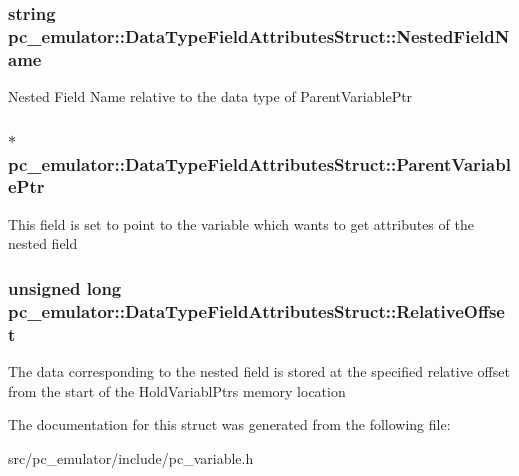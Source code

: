 \subsubsection[{\texorpdfstring{Nested\+Field\+Name}{NestedFieldName}}]{\setlength{\rightskip}{0pt plus 5cm}string pc\+\_\+emulator\+::\+Data\+Type\+Field\+Attributes\+Struct\+::\+Nested\+Field\+Name}\hypertarget{structpc__emulator_1_1DataTypeFieldAttributesStruct_a38b068714c3b4e3bb59cb5406fbb93f2}{}\label{structpc__emulator_1_1DataTypeFieldAttributesStruct_a38b068714c3b4e3bb59cb5406fbb93f2}
Nested Field Name relative to the data type of Parent\+Variable\+Ptr 
\subsubsection[{\texorpdfstring{Parent\+Variable\+Ptr}{ParentVariablePtr}}]{$\ast$ pc\+\_\+emulator\+::\+Data\+Type\+Field\+Attributes\+Struct\+::\+Parent\+Variable\+Ptr}\hypertarget{structpc__emulator_1_1DataTypeFieldAttributesStruct_a8ef95a5a44edd724fc88884d969ee65e}{}\label{structpc__emulator_1_1DataTypeFieldAttributesStruct_a8ef95a5a44edd724fc88884d969ee65e}
This field is set to point to the variable which want\textquotesingle{}s to get attributes of the nested field 
\subsubsection[{\texorpdfstring{Relative\+Offset}{RelativeOffset}}]{\setlength{\rightskip}{0pt plus 5cm}unsigned long pc\+\_\+emulator\+::\+Data\+Type\+Field\+Attributes\+Struct\+::\+Relative\+Offset}\hypertarget{structpc__emulator_1_1DataTypeFieldAttributesStruct_a9690def189b94d7515ae0ef00f3470ff}{}\label{structpc__emulator_1_1DataTypeFieldAttributesStruct_a9690def189b94d7515ae0ef00f3470ff}
The data corresponding to the nested field is stored at the specified relative offset from the start of the Hold\+Variabl\+Ptr\textquotesingle{}s memory location 

The documentation for this struct was generated from the following file\+:\begin{DoxyCompactItemize}
\item 
src/pc\+\_\+emulator/include/pc\+\_\+variable.\+h\end{DoxyCompactItemize}
